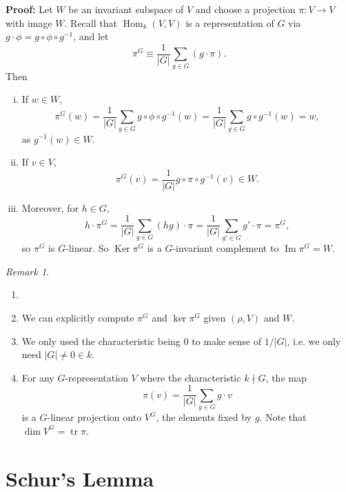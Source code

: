 \documentclass[12pt]{article}
\DeclareMathOperator{\Ker}{Ker}
\DeclareMathOperator{\Img}{Im}
\DeclareMathOperator{\tr}{tr}
\DeclareMathOperator{\Hom}{Hom}
\theoremstyle{definition}
\theoremstyle{remark}
\newtheorem*{remark}{Remark}
\begin{document}
\begin{adjustbox}{minipage = \columnwidth - 25.5pt, margin=1em, frame=1pt, margin=0em}
	\textbf{Proof:} Let $W$ be an invariant subspace of $V$ and choose a projection $\pi : V \to V$ with image $W$. Recall that $\Hom_k(V, V)$ is a representation of $G$ via $g \cdot \phi = g \circ \phi \circ g^{-1}$, and let 
	\[
		\pi^{G} \equiv \frac{1}{|G|} \sum_{g \in G}(g \cdot \pi)
	.\]
	Then
	\begin{enumerate}[(i)]
		\item If $w \in W$,
			\[
				\pi^{G}(w) = \frac{1}{|G|} \sum_{g \in G} g \circ \phi \circ g^{-1}(w) = \frac{1}{|G|} \sum_{g \in G} g \circ g^{-1}(w) = w
			,\]
			as $g^{-1}(w) \in W$.
		\item If $v \in V$,
			\[
				\pi^{G}(v) = \frac{1}{|G|} g \circ \pi \circ g^{-1}(v) \in W
			.\]
		\item Moreover, for $h \in G$,
			\[
				h \cdot \pi^{G} = \frac{1}{|G|} \sum_{g \in G}(hg) \cdot \pi = \frac{1}{|G|} \sum_{g' \in G} g' \cdot \pi = \pi^{G}
			,\]
			so $\pi^{G}$ is $G$-linear. So $\Ker \pi^{G}$ is a $G$-invariant complement to $\Img \pi^{G} = W$.
	\end{enumerate}
	
\end{adjustbox}

\begin{remark}
	\begin{enumerate}[(1)]
		\item[]
		\item We can explicitly compute $\pi^{G}$ and $\ker \pi^{G}$ given $(\rho, V)$ and $W$.
		\item We only used the characteristic being 0 to make sense of  $1/|G|$, i.e. we only need $|G| \neq 0 \in k$.
		\item For any $G$-representation $V$ where the characteristic $k \nmid G$, the map
			\[
				\pi(v) = \frac{1}{|G|} \sum_{g \in G} g \cdot v
			\]
			is a $G$-linear projection onto $V^{G}$, the elements fixed by $g$. Note that $\dim V^{G} = \tr \pi$.
	\end{enumerate}
	
\end{remark}

\newpage

\section{Schur's Lemma}%
\label{sec:schur_s_lemma}
\end{document}
